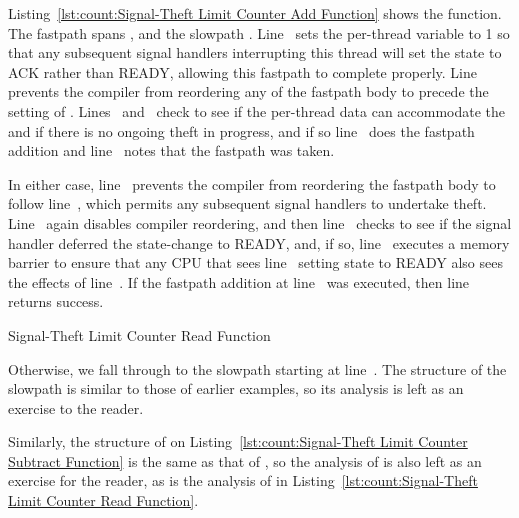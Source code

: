 \begin{lineref}
Listing~\ref{lst:count:Signal-Theft Limit Counter Add Function}
shows the  function.
The fastpath spans , and the slowpath
.
Line~ sets the per-thread  variable to 1 so that
any subsequent signal handlers interrupting this thread will
set the  state to ACK rather than READY, allowing this
fastpath to complete properly.
Line~ prevents the compiler from reordering any of the fastpath body
to precede the setting of .
Lines~ and~ check to see
if the per-thread data can accommodate
the  and if there is no ongoing theft in progress,
and if so line~ does the fastpath addition and
line~ notes that
the fastpath was taken.

In either case, line~ prevents the compiler from reordering the
fastpath body to follow line~, which permits any subsequent signal
handlers to undertake theft.
Line~ again disables compiler reordering, and then
line~
checks to see if the signal handler deferred the 
state-change to READY, and, if so, line~ executes a memory
barrier to ensure that any CPU that sees line~ setting state to
READY also sees the effects of line~.
If the fastpath addition at line~ was executed, then
line~ returns
success.
\end{lineref}

\begin{listing}[tbp]

\caption{Signal-Theft Limit Counter Read Function}
\label{lst:count:Signal-Theft Limit Counter Read Function}
\end{listing}

\begin{lineref}
Otherwise, we fall through to the slowpath starting at line~.
The structure of the slowpath is similar to those of earlier examples,
so its analysis is left as an exercise to the reader.
\end{lineref}
Similarly, the structure of  on
Listing~\ref{lst:count:Signal-Theft Limit Counter Subtract Function}
is the same
as that of , so the analysis of  is also
left as an exercise for the reader, as is the analysis of
 in
Listing~\ref{lst:count:Signal-Theft Limit Counter Read Function}.


